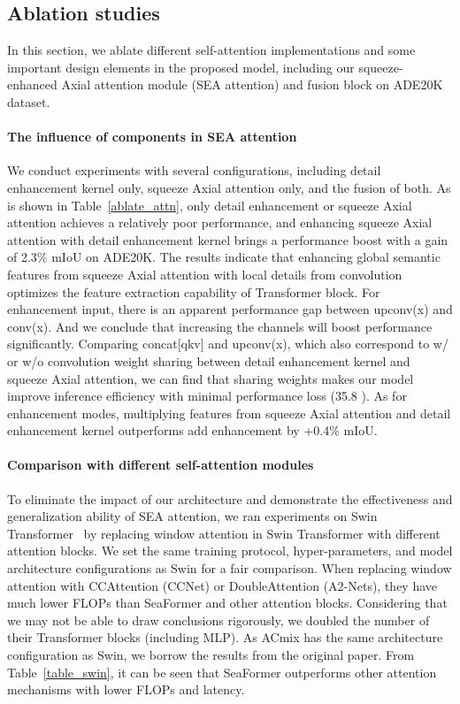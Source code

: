 \subsection{Ablation studies}
In this section, we ablate different self-attention implementations and some important design elements in the proposed model, including our squeeze-enhanced Axial attention module (SEA attention) and fusion block on ADE20K dataset.

\paragraph{The influence of components in SEA attention}
We conduct experiments with several configurations, including detail enhancement kernel only, squeeze Axial attention only, and the fusion of both. 
As is shown in Table~\ref{ablate_attn}, only detail enhancement or squeeze Axial attention achieves a relatively poor performance, and enhancing squeeze Axial attention with detail enhancement kernel brings a performance boost with a gain of 2.3\% mIoU on ADE20K. 
The results indicate that enhancing global semantic features from squeeze Axial attention with local details from convolution optimizes the feature extraction capability of Transformer block. 
For enhancement input, there is an apparent performance gap between upconv(x) and conv(x). And we conclude that increasing the channels will boost performance significantly.
Comparing concat[qkv] and upconv(x), which also correspond to w/ or w/o convolution weight sharing between detail enhancement kernel and squeeze Axial attention, we can find that sharing weights makes our model improve inference efficiency with minimal performance loss (35.8 ).
As for enhancement modes, multiplying features from squeeze Axial attention and detail enhancement kernel outperforms add enhancement by +0.4\% mIoU. 



\paragraph{Comparison with different self-attention modules}

To eliminate the impact of our architecture and demonstrate the effectiveness and generalization ability of SEA attention, we ran experiments on Swin Transformer~\cite{liu2021swin} by replacing window attention in Swin Transformer with different attention blocks.
We set the same training protocol, hyper-parameters, and model architecture configurations as Swin for a fair comparison. 
When replacing window attention with CCAttention (CCNet) or DoubleAttention (A2-Nets), they have much lower FLOPs than SeaFormer and other attention blocks. 
Considering that we may not be able to draw conclusions rigorously, we doubled the number of their Transformer blocks (including MLP).
As ACmix has the same architecture configuration as Swin, we borrow the results from the original paper. 
From Table~\ref{table_swin}, it can be seen that SeaFormer outperforms other attention mechanisms with lower FLOPs and latency.

